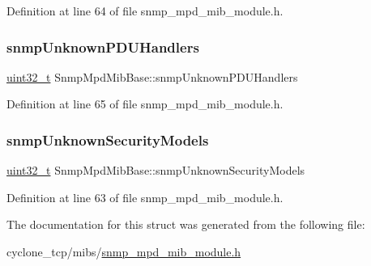 Definition at line 64 of file snmp\+\_\+mpd\+\_\+mib\+\_\+module.\+h.

\mbox{\label{structSnmpMpdMibBase_a57cb4820c82856e73603a9eeb842c506}} 
\subsubsection{\texorpdfstring{snmp\+Unknown\+P\+D\+U\+Handlers}{snmpUnknownPDUHandlers}}
{\footnotesize\ttfamily \hyperlink{stdint_8h_a435d1572bf3f880d55459d9805097f62}{uint32\+\_\+t} Snmp\+Mpd\+Mib\+Base\+::snmp\+Unknown\+P\+D\+U\+Handlers}



Definition at line 65 of file snmp\+\_\+mpd\+\_\+mib\+\_\+module.\+h.

\mbox{\label{structSnmpMpdMibBase_a2fdfcfffc897ea81d27f7fa7aae95566}} 
\subsubsection{\texorpdfstring{snmp\+Unknown\+Security\+Models}{snmpUnknownSecurityModels}}
{\footnotesize\ttfamily \hyperlink{stdint_8h_a435d1572bf3f880d55459d9805097f62}{uint32\+\_\+t} Snmp\+Mpd\+Mib\+Base\+::snmp\+Unknown\+Security\+Models}



Definition at line 63 of file snmp\+\_\+mpd\+\_\+mib\+\_\+module.\+h.



The documentation for this struct was generated from the following file\+:\begin{DoxyCompactItemize}
\item 
cyclone\+\_\+tcp/mibs/\hyperlink{snmp__mpd__mib__module_8h}{snmp\+\_\+mpd\+\_\+mib\+\_\+module.\+h}\end{DoxyCompactItemize}
